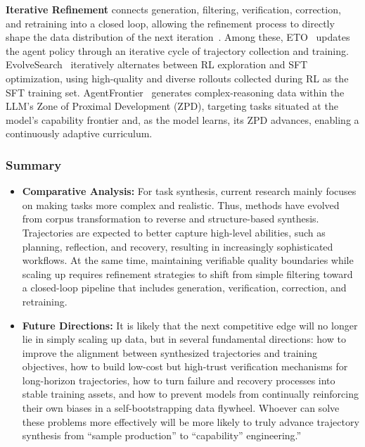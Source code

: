 \textbf{Iterative Refinement} connects generation, filtering, verification, correction, and retraining into a closed loop, allowing the refinement process to directly shape the data distribution of the next iteration~\cite{ETO, UI-TARS, EvolveSearch, Mobile-Agent-v3.5, UI-TARS-2, AgentFrontier}. Among these, ETO~\cite{ETO} updates the agent policy through an iterative cycle of trajectory collection and training. EvolveSearch~\cite{EvolveSearch} iteratively alternates between RL exploration and SFT optimization, using high-quality and diverse rollouts collected during RL as the SFT training set. AgentFrontier~\cite{AgentFrontier} generates complex-reasoning data within the LLM’s Zone of Proximal Development (ZPD), targeting tasks situated at the model’s capability frontier and, as the model learns, its ZPD advances, enabling a continuously adaptive curriculum.



\subsubsection{Summary}
\begin{tcolorbox}[takeaway,title={Takeaway 6.3}] %
\begin{itemize}
\item \textbf{Comparative Analysis:} For task synthesis, current research mainly focuses on making tasks more complex and realistic. Thus, methods have evolved from corpus transformation to reverse and structure-based synthesis. Trajectories are expected to better capture high-level abilities, such as planning, reflection, and recovery, resulting in increasingly sophisticated workflows. At the same time, maintaining verifiable quality boundaries while scaling up requires refinement strategies to shift from simple filtering toward a closed-loop pipeline that includes generation, verification, correction, and retraining.

\item \textbf{Future Directions:} It is likely that the next competitive edge will no longer lie in simply scaling up data, but in several fundamental directions: how to improve the alignment between synthesized trajectories and training objectives, how to build low-cost but high-trust verification mechanisms for long-horizon trajectories, how to turn failure and recovery processes into stable training assets, and how to prevent models from continually reinforcing their own biases in a self-bootstrapping data flywheel. Whoever can solve these problems more effectively will be more likely to truly advance trajectory synthesis from ``sample production'' to ``capability'' engineering.”


\end{itemize}
\end{tcolorbox}



